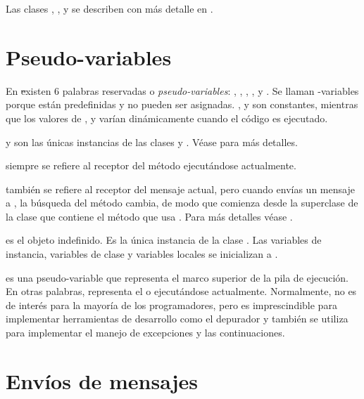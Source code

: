 \documentclass[a4paper,10pt,twoside]{book}
\begin{document}
Las clases , ,  y  se describen con m\'as detalle en .

\section{Pseudo-variables}

En \st existen 6 palabras reservadas o \emph{pseudo-variables}:
, ,  ,  ,  y .
Se llaman  -variables porque est\'an predefinidas y no pueden ser asignadas.
,  y  son constantes, mientras que los valores de ,  y  var\'ian din\'amicamente cuando el c\'odigo es ejecutado.

 y  son las \'unicas instancias de las clases   y .
V\'ease  para m\'as detalles.

 siempre se refiere al receptor del m\'etodo ejecut\'andose actualmente.

 tambi\'en se refiere al receptor del mensaje actual, pero cuando env\'ias un mensaje a \super, la b\'usqueda del m\'etodo cambia, de modo que comienza desde la superclase de la clase que contiene el m\'etodo que usa .
Para m\'as detalles v\'ease .

 es el objeto indefinido.
Es la \'unica instancia de la clase . 
Las variables de instancia, variables de clase y variables locales se inicializan a .

 es una pseudo-variable que representa el marco superior de la pila de ejecuci\'on.
En otras palabras, representa el  o  ejecut\'andose actualmente.
Normalmente,  no es de inter\'es para la mayor\'ia de los programadores, pero es imprescindible para implementar herramientas de desarrollo como el depurador y tambi\'en se utiliza para implementar el manejo de excepciones y las continuaciones.

\section{Env\'ios de mensajes}
\end{document}
